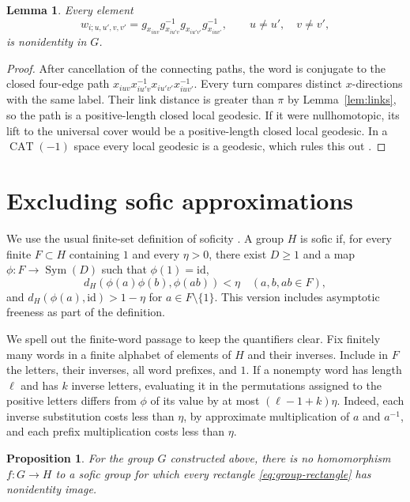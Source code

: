 \documentclass[11pt]{amsart}
\newtheorem{proposition}[theorem]{Proposition}
\newtheorem{lemma}[theorem]{Lemma}
\theoremstyle{definition}
\theoremstyle{remark}
\numberwithin{equation}{section}
\newcommand{\id}{\mathrm{id}}
\newcommand{\CAT}{\operatorname{CAT}}
\DeclareMathOperator{\Sym}{Sym}
\begin{document}
\begin{lemma}\label{lem:nontrivial}
Every element
\begin{equation}\label{eq:group-rectangle}
 w_{i;u,u',v,v'}=
 g_{x_{iuv}}g_{x_{iu'v}}^{-1}
 g_{x_{iu'v'}}g_{x_{iuv'}}^{-1},
 \qquad u\ne u',\quad v\ne v',
\end{equation}
is nonidentity in $G$.
\end{lemma}

\begin{proof}
After cancellation of the connecting paths, the word is conjugate
to the closed four-edge path
$x_{iuv}x_{iu'v}^{-1}x_{iu'v'}x_{iuv'}^{-1}$.
Every turn compares distinct $x$-directions with the same label.
Their link distance is greater than $\pi$ by
Lemma~\ref{lem:links}, so the path is a positive-length closed
local geodesic. If it were nullhomotopic, its lift to the universal
cover would be a positive-length closed local geodesic. In a
$\CAT(-1)$ space every local geodesic is a geodesic, which rules
this out \cite[Proposition~II.1.4]{BH}.
\end{proof}

\section{Excluding sofic approximations}\label{sec:sofic}

We use the usual finite-set definition of soficity
\cite{Pestov}. A group $H$ is sofic if, for every finite
$F\subset H$ containing $1$ and every $\eta>0$, there exist $D\ge1$
and a map $\phi:F\to\Sym(D)$ such that $\phi(1)=\id$,
\[
 d_H(\phi(a)\phi(b),\phi(ab))<\eta
 \quad(a,b,ab\in F),
\]
and $d_H(\phi(a),\id)>1-\eta$ for $a\in F\setminus\{1\}$.
This version includes asymptotic freeness as part of the definition.

We spell out the finite-word passage to keep the quantifiers clear.
Fix finitely many words in a finite alphabet of elements of $H$ and
their inverses. Include in $F$ the letters, their inverses, all word
prefixes, and $1$. If a nonempty word has length $\ell$ and has $k$ inverse
letters, evaluating it in the permutations assigned to the positive
letters differs from $\phi$ of its value by at most
$(\ell-1+k)\eta$. Indeed, each inverse substitution costs less than
$\eta$, by approximate multiplication of $a$ and $a^{-1}$, and
each prefix multiplication costs less than $\eta$.

\begin{proposition}\label{prop:no-sofic-target}
For the group $G$ constructed above, there is no homomorphism
$f:G\to H$ to a sofic group for which every rectangle
\eqref{eq:group-rectangle} has nonidentity image.
\end{proposition}
\end{document}
